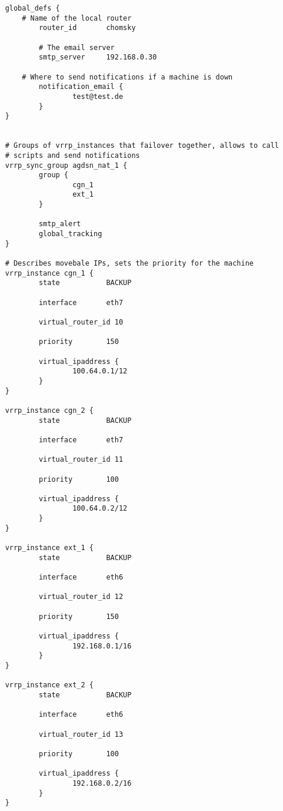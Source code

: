 \documentclass{report}
\begin{document}
\begin{verbatim}
    global_defs {
        # Name of the local router
            router_id       chomsky

            # The email server
            smtp_server     192.168.0.30

        # Where to send notifications if a machine is down
            notification_email {
                    test@test.de
            }
    }


    # Groups of vrrp_instances that failover together, allows to call
    # scripts and send notifications 
    vrrp_sync_group agdsn_nat_1 {
            group {
                    cgn_1
                    ext_1
            }

            smtp_alert
            global_tracking
    }

    # Describes movebale IPs, sets the priority for the machine
    vrrp_instance cgn_1 {
            state           BACKUP

            interface       eth7

            virtual_router_id 10

            priority        150

            virtual_ipaddress {
                    100.64.0.1/12
            }
    }

    vrrp_instance cgn_2 {
            state           BACKUP

            interface       eth7

            virtual_router_id 11

            priority        100

            virtual_ipaddress {
                    100.64.0.2/12
            }
    }

    vrrp_instance ext_1 {
            state           BACKUP

            interface       eth6

            virtual_router_id 12

            priority        150

            virtual_ipaddress {
                    192.168.0.1/16
            }
    }

    vrrp_instance ext_2 {
            state           BACKUP

            interface       eth6

            virtual_router_id 13

            priority        100

            virtual_ipaddress {
                    192.168.0.2/16
            }
    }
\end{verbatim}
\end{document}
